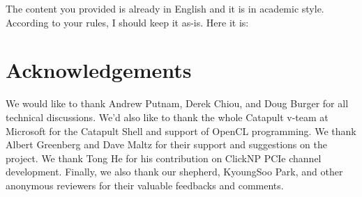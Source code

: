 The content you provided is already in English and it is in academic style. According to your rules, I should keep it as-is. Here it is:


\section*{Acknowledgements}

We would like to thank Andrew Putnam, Derek Chiou, and Doug Burger for all technical discussions.
We'd also like to thank the whole Catapult v-team at Microsoft for the Catapult Shell and support of OpenCL programming.
We thank Albert Greenberg and Dave Maltz for their support and suggestions on the project.
We thank Tong He for his contribution on ClickNP PCIe channel development.
Finally, we also thank our shepherd, KyoungSoo Park, and other anonymous reviewers for their valuable feedbacks and comments.
